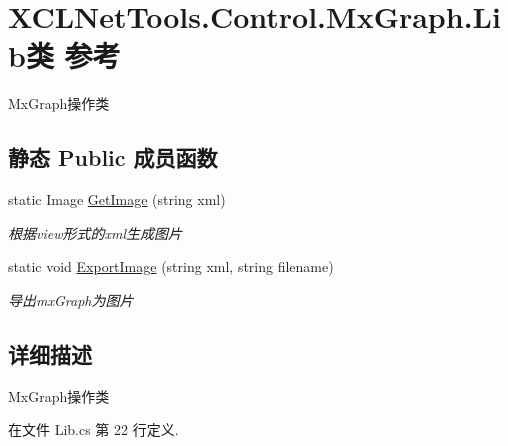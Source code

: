 \hypertarget{class_x_c_l_net_tools_1_1_control_1_1_mx_graph_1_1_lib}{\section{X\-C\-L\-Net\-Tools.\-Control.\-Mx\-Graph.\-Lib类 参考}
\label{class_x_c_l_net_tools_1_1_control_1_1_mx_graph_1_1_lib}
}


Mx\-Graph操作类  


\subsection*{静态 Public 成员函数}
\begin{DoxyCompactItemize}
\item 
static Image \hyperlink{class_x_c_l_net_tools_1_1_control_1_1_mx_graph_1_1_lib_abff455d51f61485d6bf26e0133af6000}{Get\-Image} (string xml)
\begin{DoxyCompactList}\small\item\em 根据view形式的xml生成图片 \end{DoxyCompactList}\item 
static void \hyperlink{class_x_c_l_net_tools_1_1_control_1_1_mx_graph_1_1_lib_ad6b09c60b11a1f51a6bf45cc3bde1b88}{Export\-Image} (string xml, string filename)
\begin{DoxyCompactList}\small\item\em 导出mx\-Graph为图片 \end{DoxyCompactList}\end{DoxyCompactItemize}


\subsection{详细描述}
Mx\-Graph操作类 



在文件 Lib.\-cs 第 22 行定义.



